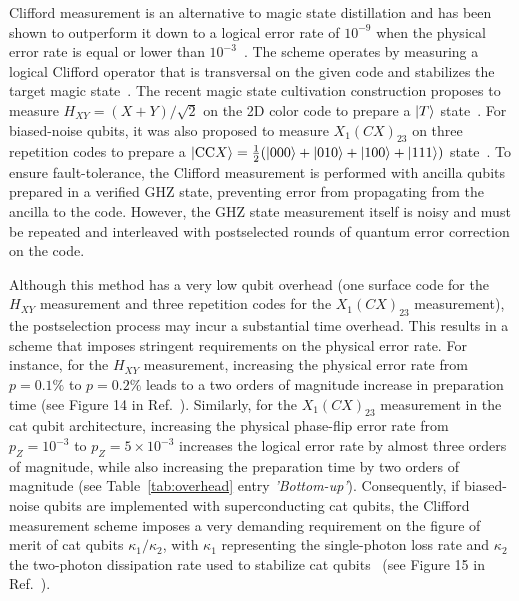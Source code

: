 \documentclass[%
 reprint,
superscriptaddress,
 amsmath,amssymb,
 aps,
]{revtex4-2}
\begin{document}
Clifford measurement is an alternative to magic state distillation and has been shown to outperform it down to a logical error rate of $10^{-9}$ when the physical error rate is equal or lower than $10^{-3}$~\cite{gidney2024magic}. The scheme operates by measuring a logical Clifford operator that is transversal on the given code and stabilizes the target magic state~\cite{shor1996fault,gottesman1999demonstrating, zhou2000methodology}. The recent magic state cultivation construction proposes to measure $H_{XY} = (X+Y)/\sqrt{2}$ on the 2D color code to prepare a $\ket{T}$ state~\cite{zhou2000methodology,gidney2024magic}. For biased-noise qubits, it was also proposed to measure $X_1 (CX)_{23}$ on three repetition codes to prepare a $\ket{\text{CC}X} = \tfrac{1}{2}(\ket{000} + \ket{010} + \ket{100} + \ket{111})$ state~\cite{zhou2000methodology,chamberland2022building}. To ensure fault-tolerance, the Clifford measurement is performed with ancilla qubits prepared in a verified GHZ state, preventing error from propagating from the ancilla to the code. However, the GHZ state measurement itself is noisy and must be repeated and interleaved with postselected rounds of quantum error correction on the code.

Although this method has a very low qubit overhead (one surface code for the $H_{XY}$ measurement and three repetition codes for the $X_1 (CX)_{23}$ measurement),  the postselection process may incur a substantial time overhead. This results in a scheme that imposes stringent requirements on the physical error rate. For instance, for the $H_{XY}$ measurement, increasing the physical error rate from $p = 0.1\%$ to $p = 0.2\%$ leads to a two orders of magnitude increase in preparation time (see Figure 14 in Ref.~\cite{gidney2024magic}). Similarly, for the $X_1 (CX)_{23}$ measurement in the cat qubit architecture, increasing the physical phase-flip error rate from $p_Z = 10^{-3}$ to $p_Z = 5 \times 10^{-3}$ increases the logical error rate by almost three orders of magnitude, while also increasing the preparation time by two orders of magnitude (see Table~\ref{tab:overhead} entry \textit{'Bottom-up'}). Consequently, if biased-noise qubits are implemented with superconducting cat qubits, the Clifford measurement scheme imposes a very demanding requirement on the figure of merit of cat qubits $\kappa_1/\kappa_2$, with $\kappa_1$ representing the single-photon loss rate and $\kappa_2$ the two-photon dissipation rate used to stabilize cat qubits~\cite{guillaud2019repetition} (see Figure 15 in Ref.~\cite{chamberland2022building}).
\end{document}
